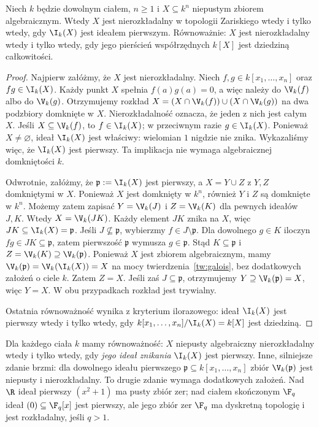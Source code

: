 \begin{twierdzenie}
\label{tw:irreducible-prime}
Niech $k$ będzie dowolnym ciałem, $n\ge1$
i $X\subseteq k^n$ niepustym zbiorem algebraicznym.
Wtedy $X$ jest nierozkładalny w topologii Zariskiego
wtedy i tylko wtedy, gdy $\I_k(X)$ jest ideałem pierwszym.
Równoważnie: $X$ jest nierozkładalny wtedy i tylko wtedy,
gdy jego pierścień współrzędnych $k[X]$ jest dziedziną całkowitości.
\end{twierdzenie}
\begin{proof}
Najpierw załóżmy, że $X$ jest nierozkładalny.
Niech $f,g\in k[x_1,\dots,x_n]$ oraz $fg\in\I_k(X)$.
Każdy punkt $X$ spełnia $f(a)g(a)=0$,
a więc należy do $\V_k(f)$ albo do $\V_k(g)$.
Otrzymujemy rozkład
$X=(X\cap\V_k(f))\cup(X\cap\V_k(g))$
na dwa podzbiory domknięte w $X$. Nierozkładalność oznacza,
że jeden z nich jest całym $X$.
Jeśli $X\subseteq\V_k(f)$, to $f\in\I_k(X)$;
w przeciwnym razie $g\in\I_k(X)$. Ponieważ $X\ne\varnothing$,
ideał $\I_k(X)$ jest właściwy: wielomian $1$ nigdzie nie znika.
Wykazaliśmy więc, że $\I_k(X)$ jest pierwszy.
Ta implikacja nie wymaga algebraicznej domkniętości $k$.

Odwrotnie, załóżmy, że $\mathfrak p:=\I_k(X)$ jest pierwszy,
a $X=Y\cup Z$ z $Y,Z$ domkniętymi w $X$.
Ponieważ $X$ jest domknięty w $k^n$, również $Y$ i $Z$
są domknięte w $k^n$. Możemy zatem zapisać
$Y=\V_k(J)$ i $Z=\V_k(K)$ dla pewnych ideałów $J,K$.
Wtedy $X=\V_k(JK)$.
Każdy element $JK$ znika na $X$, więc $JK\subseteq\I_k(X)=\mathfrak p$.
Jeśli $J\not\subseteq\mathfrak p$, wybierzmy $f\in J\setminus\mathfrak p$.
Dla dowolnego $g\in K$ iloczyn $fg\in JK\subseteq\mathfrak p$,
zatem pierwszość $\mathfrak p$ wymusza $g\in\mathfrak p$.
Stąd $K\subseteq\mathfrak p$ i
$Z=\V_k(K)\supseteq\V_k(\mathfrak p)$.
Ponieważ $X$ jest zbiorem algebraicznym, mamy
$\V_k(\mathfrak p)=\V_k(\I_k(X))=X$
na mocy twierdzenia~\ref{tw:galois}, bez dodatkowych
założeń o ciele $k$. Zatem $Z=X$.
Jeśli zaś $J\subseteq\mathfrak p$, otrzymujemy
$Y\supseteq\V_k(\mathfrak p)=X$, więc $Y=X$.
W obu przypadkach rozkład jest trywialny.

Ostatnia równoważność wynika z kryterium ilorazowego:
ideał $\I_k(X)$ jest pierwszy wtedy i tylko wtedy,
gdy $k[x_1,\dots,x_n]/\I_k(X)=k[X]$ jest dziedziną.
\end{proof}

\begin{uwaga}
Dla każdego ciała $k$ mamy równoważność:
$X$ niepusty algebraiczny nierozkładalny wtedy i tylko wtedy,
gdy \emph{jego ideał znikania} $\I_k(X)$ jest pierwszy.
Inne, silniejsze zdanie brzmi: dla dowolnego ideału pierwszego
$\mathfrak p\subseteq k[x_1,\dots,x_n]$ zbiór
$\V_k(\mathfrak p)$ jest niepusty i nierozkładalny.
To drugie zdanie wymaga dodatkowych założeń. Nad $\R$
ideał pierwszy $(x^2+1)$ ma pusty zbiór zer; nad ciałem
skończonym $\F_q$ ideał $(0)\subseteq\F_q[x]$
jest pierwszy, ale jego zbiór zer $\F_q$ ma dyskretną
topologię i jest rozkładalny, jeśli $q>1$.
\end{uwaga}

